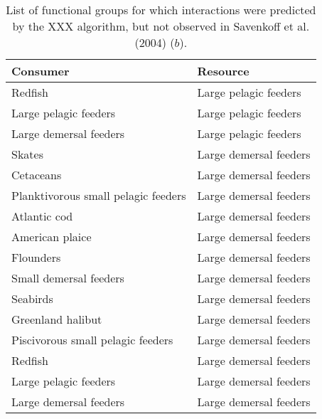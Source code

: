 \documentclass[letterpaper]{article}
\begin{document}
\begin{table}[h!]
    \centering
    \begin{tabular}{|l|l|}
    \hline
    Consumer               & Resource \\
    \hline    \hline
    Redfish                             & Large pelagic feeders \\
    Large pelagic feeders               & Large pelagic feeders \\
    Large demersal feeders              & Large pelagic feeders \\
    Skates                              & Large demersal feeders    \\
    Cetaceans                           & Large demersal feeders    \\
    Planktivorous small pelagic feeders & Large demersal feeders    \\
    Atlantic cod                        & Large demersal feeders    \\
    American plaice                     & Large demersal feeders    \\
    Flounders                           & Large demersal feeders    \\
    Small demersal feeders              & Large demersal feeders    \\
    Seabirds                            & Large demersal feeders    \\
    Greenland halibut                   & Large demersal feeders    \\
    Piscivorous small pelagic feeders   & Large demersal feeders    \\
    Redfish                             & Large demersal feeders    \\
    Large pelagic feeders               & Large demersal feeders    \\
    Large demersal feeders              & Large demersal feeders    \\
    \hline
\end{tabular}
    \caption{List of functional groups for which interactions were predicted by the XXX algorithm, but not observed in Savenkoff et al. (2004) ($b$).}
\end{table}
\end{document}
